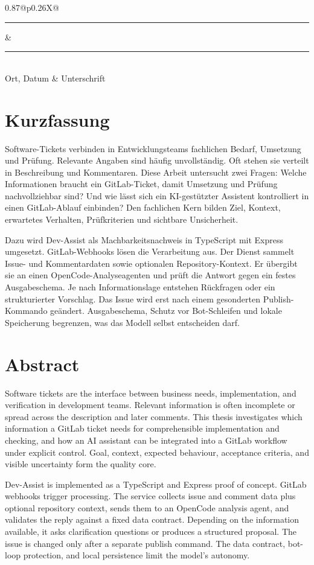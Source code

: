 \documentclass[12pt,a4paper,oneside]{scrreprt}
\begin{document}
\vspace{2.2cm}
\begin{tabularx}{0.87\textwidth}{@{}p{0.26\textwidth}X@{}}
\rule{0.26\textwidth}{0.4pt} & \rule{\linewidth}{0.4pt} \\
Ort, Datum & Unterschrift
\end{tabularx}
\clearpage

\chapter*{Kurzfassung}
Software-Tickets verbinden in Entwicklungsteams fachlichen Bedarf, Umsetzung und Prüfung. Relevante Angaben sind häufig unvollständig. Oft stehen sie verteilt in Beschreibung und Kommentaren. Diese Arbeit untersucht zwei Fragen: Welche Informationen braucht ein GitLab-Ticket, damit Umsetzung und Prüfung nachvollziehbar sind? Und wie lässt sich ein KI-gestützter Assistent kontrolliert in einen GitLab-Ablauf einbinden? Den fachlichen Kern bilden Ziel, Kontext, erwartetes Verhalten, Prüfkriterien und sichtbare Unsicherheit.

Dazu wird Dev-Assist als Machbarkeitsnachweis in TypeScript mit Express umgesetzt. GitLab-Webhooks lösen die Verarbeitung aus. Der Dienst sammelt Issue- und Kommentardaten sowie optionalen Repository-Kontext. Er übergibt sie an einen OpenCode-Analyseagenten und prüft die Antwort gegen ein festes Ausgabeschema. Je nach Informationslage entstehen Rückfragen oder ein strukturierter Vorschlag. Das Issue wird erst nach einem gesonderten Publish-Kommando geändert. Ausgabeschema, Schutz vor Bot-Schleifen und lokale Speicherung begrenzen, was das Modell selbst entscheiden darf.

\chapter*{Abstract}
Software tickets are the interface between business needs, implementation, and verification in development teams. Relevant information is often incomplete or spread across the description and later comments. This thesis investigates which information a GitLab ticket needs for comprehensible implementation and checking, and how an AI assistant can be integrated into a GitLab workflow under explicit control. Goal, context, expected behaviour, acceptance criteria, and visible uncertainty form the quality core.

Dev-Assist is implemented as a TypeScript and Express proof of concept. GitLab webhooks trigger processing. The service collects issue and comment data plus optional repository context, sends them to an OpenCode analysis agent, and validates the reply against a fixed data contract. Depending on the information available, it asks clarification questions or produces a structured proposal. The issue is changed only after a separate publish command. The data contract, bot-loop protection, and local persistence limit the model's autonomy.
\end{document}
